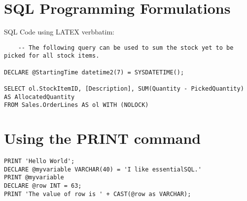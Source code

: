 \newpage
\section {SQL Programming Formulations}

\sample SQL Code using LATEX verbbatim:

\begin{verbatim}
    -- The following query can be used to sum the stock yet to be picked for all stock items.

DECLARE @StartingTime datetime2(7) = SYSDATETIME();

SELECT ol.StockItemID, [Description], SUM(Quantity - PickedQuantity) AS AllocatedQuantity
FROM Sales.OrderLines AS ol WITH (NOLOCK)
\end{verbatim}

\section {Using the PRINT command}
\begin{lstlisting}[frame=single]
PRINT 'Hello World';
DECLARE @myvariable VARCHAR(40) = 'I like essentialSQL.'
PRINT @myvariable
DECLARE @row INT = 63;
PRINT 'The value of row is ' + CAST(@row as VARCHAR);
\end{lstlisting}


